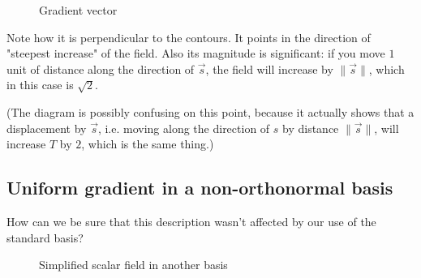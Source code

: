 \begin{figure}[h]
    \caption{Gradient vector}
    \centering
    \label{fig:gradient-vector}
\end{figure}

Note how it is perpendicular to the contours. It points in the direction of "steepest increase" of the field. Also its magnitude is significant: if you move $1$ unit of distance along the direction of $\vec{s}$, the field will increase by $\|\vec{s}\|$, which in this case is $\sqrt{2}$.

(The diagram is possibly confusing on this point, because it actually shows that a displacement by $\vec{s}$, i.e. moving along the direction of $s$ by distance $\|\vec{s}\|$, will increase $T$ by $2$, which is the same thing.)

\subsection{Uniform gradient in a non-orthonormal basis}

How can we be sure that this description wasn't affected by our use of the standard basis?

\begin{figure}[h]
    \caption{Simplified scalar field in another basis}
    \centering
    \label{fig:scalar-field-awkward-basis}
\end{figure}

